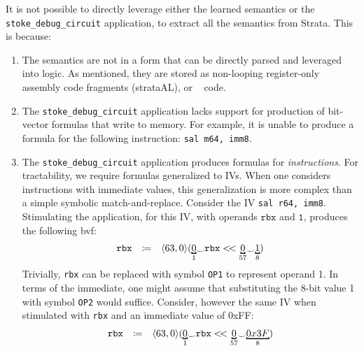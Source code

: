 It is not possible to directly leverage either the learned semantics or the \texttt{stoke\_debug\_circuit} application, to extract all the semantics from Strata.
This is because:
\begin{enumerate}
\item The semantics are not in a form that can be directly parsed and leveraged into logic. 
As mentioned, they are stored as non-looping register-only assembly code fragments (strataAL), or \CC~ code. 
\item The \texttt{stoke\_debug\_circuit} application lacks support for production of bit-vector formulas that write to memory. For example, it is unable to produce a formula for the following instruction: 
\texttt{sal m64, imm8}.
\item The \texttt{stoke\_debug\_circuit} application produces formulas for \emph{instructions}. For tractability, we require formulas generalized to IVs. 
When one considers instructions with immediate values, this generalization is more complex than a simple symbolic match-and-replace. 
Consider the IV \texttt{sal r64, imm8}.
Stimulating the application, for this IV, with operands $\mathtt{rbx}$ and $\mathtt{1}$, produces the following bvf: 
\[
\begin{array}{lcl}
\mathtt{rbx} & \coloneqq & \langle 63,0\rangle(\bitmoded{1}{0} {_\smile} \mathtt{rbx} <\!< \bitmoded{57}{0} {_\smile} \bitmoded{8}{1})
\end{array}
\]
Trivially, \texttt{rbx} can be replaced with symbol \texttt{OP1} to represent operand 1. 
In terms of the immediate, one might assume that substituting the 8-bit value 1 with symbol \texttt{OP2} would suffice.
Consider, however the same IV when stimulated with \texttt{rbx} and an immediate value of 0xFF:
\[
\begin{array}{lcl}
\mathtt{rbx} & \coloneqq & \langle 63,0\rangle(\bitmoded{1}{0} {_\smile} \mathtt{rbx} <\!< \bitmoded{57}{0} {_\smile} \bitmoded{8}{0x3F})

\end{array}\]
\end{enumerate}
